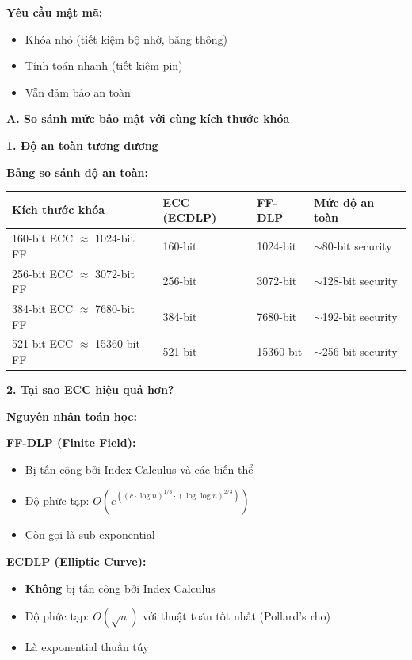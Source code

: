 \textbf{Yêu cầu mật mã:}
\begin{itemize}
    \item Khóa nhỏ (tiết kiệm bộ nhớ, băng thông)
    \item Tính toán nhanh (tiết kiệm pin)
    \item Vẫn đảm bảo an toàn
\end{itemize}

\textbf{A. So sánh mức bảo mật với cùng kích thước khóa}

\textbf{1. Độ an toàn tương đương}

\textbf{Bảng so sánh độ an toàn:}

\begin{center}
\begin{tabular}{|p{3.5cm}|p{2.5cm}|p{2.5cm}|p{3cm}|}
\hline
\textbf{Kích thước khóa} & \textbf{ECC (ECDLP)} & \textbf{FF-DLP} & \textbf{Mức độ an toàn} \\
\hline
160-bit ECC $\approx$ 1024-bit FF & 160-bit & 1024-bit & $\sim$80-bit security \\
256-bit ECC $\approx$ 3072-bit FF & 256-bit & 3072-bit & $\sim$128-bit security \\
384-bit ECC $\approx$ 7680-bit FF & 384-bit & 7680-bit & $\sim$192-bit security \\
521-bit ECC $\approx$ 15360-bit FF & 521-bit & 15360-bit & $\sim$256-bit security \\
\hline
\end{tabular}
\end{center}

\textbf{2. Tại sao ECC hiệu quả hơn?}

\textbf{Nguyên nhân toán học:}

\textbf{FF-DLP (Finite Field):}
\begin{itemize}
    \item Bị tấn công bởi Index Calculus và các biến thể
    \item Độ phức tạp: $O(e^{((c \cdot \log n)^{1/3} \cdot (\log \log n)^{2/3})})$
    \item Còn gọi là sub-exponential
\end{itemize}

\textbf{ECDLP (Elliptic Curve):}
\begin{itemize}
    \item \textbf{Không} bị tấn công bởi Index Calculus
    \item Độ phức tạp: $O(\sqrt{n})$ với thuật toán tốt nhất (Pollard's rho)
    \item Là exponential thuần túy
\end{itemize}


